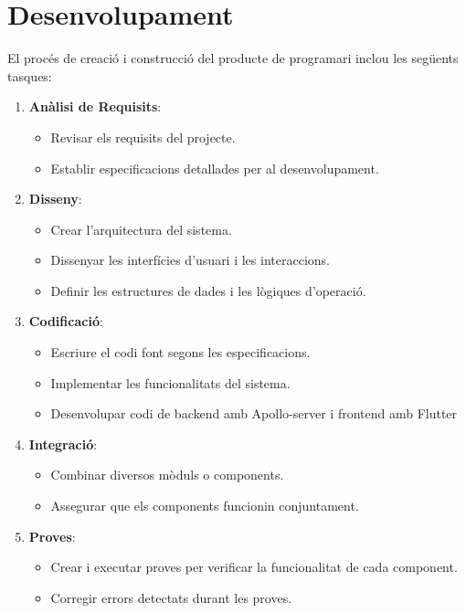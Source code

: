 \documentclass[a4paper,12pt,twoside]{ThesisStyle}
\begin{document}
\section{Desenvolupament}

El procés de creació i construcció del producte de programari inclou les següents tasques:

\begin{enumerate}
  \item \textbf{Anàlisi de Requisits}:
  \begin{itemize}
      \item Revisar els requisits del projecte.
      \item Establir especificacions detallades per al desenvolupament.
  \end{itemize}

  \item \textbf{Disseny}:
  \begin{itemize}
      \item Crear l'arquitectura del sistema.
      \item Dissenyar les interfícies d'usuari i les interaccions.
      \item Definir les estructures de dades i les lògiques d'operació.
  \end{itemize}

  \item \textbf{Codificació}:
  \begin{itemize}
      \item Escriure el codi font segons les especificacions.
      \item Implementar les funcionalitats del sistema.
      \item Desenvolupar codi de backend amb Apollo-server i frontend amb Flutter
  \end{itemize}

  \item \textbf{Integració}:
  \begin{itemize}
      \item Combinar diversos mòduls o components.
      \item Assegurar que els components funcionin conjuntament.
  \end{itemize}

  \item \textbf{Proves}:
  \begin{itemize}
      \item Crear i executar proves per verificar la funcionalitat de cada component.
      \item Corregir errors detectats durant les proves.
  \end{itemize}


\end{enumerate}
\end{document}
